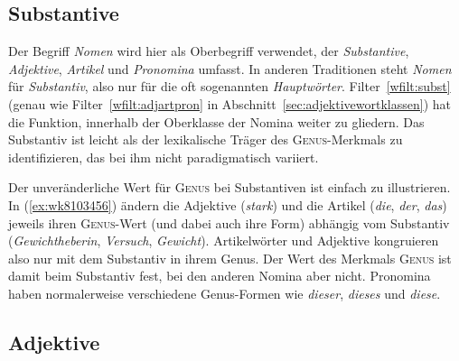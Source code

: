 
\subsection{Substantive}

\label{sec:substantivewortklassen}

Der Begriff \textit{Nomen} wird hier als Oberbegriff verwendet, der \textit{Substantive}, \textit{Adjektive}, \textit{Artikel} und \textit{Pronomina} umfasst.
In anderen Traditionen steht \textit{Nomen} für \textit{Substantiv}, also nur für die oft sogenannten \textit{Hauptwörter}.
Filter~\ref{wfilt:subst} (genau wie Filter~\ref{wfilt:adjartpron} in Abschnitt~\ref{sec:adjektivewortklassen}) hat die Funktion, innerhalb der Oberklasse der Nomina weiter zu gliedern.
Das Substantiv ist leicht als der lexikalische Träger des \textsc{Genus}-Merkmals zu identifizieren, das bei ihm nicht paradigmatisch variiert.


Der unveränderliche Wert für \textsc{Genus} bei Substantiven ist einfach zu illustrieren.
In (\ref{ex:wk8103456}) ändern die Adjektive (\textit{stark}) und die Artikel (\textit{die}, \textit{der}, \textit{das}) jeweils ihren \textsc{Genus}-Wert (und dabei auch ihre Form) abhängig vom Substantiv (\textit{Gewichtheberin}, \textit{Versuch}, \textit{Gewicht}).
Artikelwörter und Adjektive kongruieren also nur mit dem Substantiv in ihrem Genus.
Der Wert des Merkmals \textsc{Genus} ist damit beim Substantiv fest, bei den anderen Nomina aber nicht.
Pronomina haben normalerweise verschiedene Genus-Formen wie \textit{dieser}, \textit{dieses} und \textit{diese}.

\begin{exe}
  \ex\label{ex:wk8103456}
  \begin{xlist}
  \end{xlist}
\end{exe}

\subsection{Adjektive}

